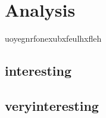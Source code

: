\newpage\cleardoublepage{}
\section{Analysis}

uoyegnrfonexubxfeulhxfleh

\subsection{interesting}

\subsection{veryinteresting}

